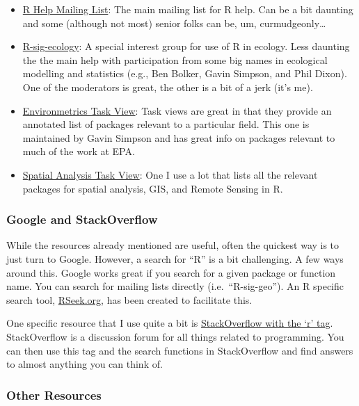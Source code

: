 \documentclass[]{article}
\providecommand{\tightlist}{%
  \setlength{\itemsep}{0pt}\setlength{\parskip}{0pt}}
\begin{document}
\begin{itemize}
\tightlist
\item
  \href{https://stat.ethz.ch/mailman/listinfo/r-help}{R Help Mailing
  List}: The main mailing list for R help. Can be a bit daunting and
  some (although not most) senior folks can be, um, curmudgeonly\ldots{}
\item
  \href{https://stat.ethz.ch/mailman/listinfo/r-sig-ecology}{R-sig-ecology}:
  A special interest group for use of R in ecology. Less daunting the
  the main help with participation from some big names in ecological
  modelling and statistics (e.g., Ben Bolker, Gavin Simpson, and Phil
  Dixon). One of the moderators is great, the other is a bit of a jerk
  (it's me).
\item
  \href{http://cran.r-project.org/web/views/Environmetrics.html}{Environmetrics
  Task View}: Task views are great in that they provide an annotated
  list of packages relevant to a particular field. This one is
  maintained by Gavin Simpson and has great info on packages relevant to
  much of the work at EPA.
\item
  \href{http://cran.r-project.org/web/views/Spatial.html}{Spatial
  Analysis Task View}: One I use a lot that lists all the relevant
  packages for spatial analysis, GIS, and Remote Sensing in R.
\end{itemize}

\hypertarget{google-and-stackoverflow}{%
\subsubsection{Google and
StackOverflow}\label{google-and-stackoverflow}}

While the resources already mentioned are useful, often the quickest way
is to just turn to Google. However, a search for ``R'' is a bit
challenging. A few ways around this. Google works great if you search
for a given package or function name. You can search for mailing lists
directly (i.e.~``R-sig-geo''). An R specific search tool,
\href{http://www.rseek.org/}{RSeek.org}, has been created to facilitate
this.

One specific resource that I use quite a bit is
\href{http://stackoverflow.com/questions/tagged/r}{StackOverflow with
the `r' tag}. StackOverflow is a discussion forum for all things related
to programming. You can then use this tag and the search functions in
StackOverflow and find answers to almost anything you can think of.

\hypertarget{other-resources}{%
\subsubsection{Other Resources}\label{other-resources}}
\end{document}
